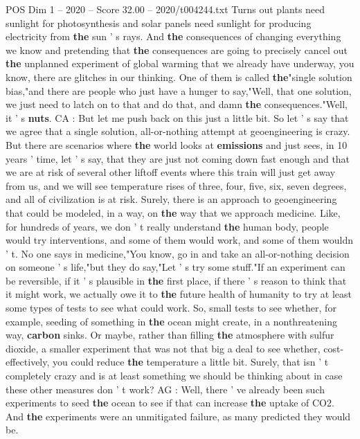 \begin{textsample}{POS Dim 1 – 2020 – Score 32.00 – 2020/t004244.txt}
Turns out plants need sunlight for photosynthesis and solar panels need sunlight for producing electricity from \textbf{the} sun ' s rays.
And \textbf{the} consequences of changing everything we know and pretending that \textbf{the} consequences are going to precisely cancel out \textbf{the} unplanned experiment of global warming that we already have underway, you know, there are glitches in our thinking.
One of them is called \textbf{the}"single solution bias,"and there are people who just have a hunger to say,"Well, that one solution, we just need to latch on to that and do that, and damn \textbf{the} consequences."Well, it ' s \textbf{nuts}.
CA : But let me push back on this just a little bit.
So let ' s say that we agree that a single solution, all-or-nothing attempt at geoengineering is crazy.
But there are scenarios where \textbf{the} world looks at \textbf{emissions} and just sees, in 10 years ' time, let ' s say, that they are just not coming down fast enough and that we are at risk of several other liftoff events where this train will just get away from us, and we will see temperature rises of three, four, five, six, seven degrees, and all of civilization is at risk.
Surely, there is an approach to geoengineering that could be modeled, in a way, on \textbf{the} way that we approach medicine.
Like, for hundreds of years, we don ' t really understand \textbf{the} human body, people would try interventions, and some of them would work, and some of them wouldn ' t.
No one says in medicine,"You know, go in and take an all-or-nothing decision on someone ' s life,"but they do say,"Let ' s try some stuff."If an experiment can be reversible, if it ' s plausible in \textbf{the} first place, if there ' s reason to think that it might work, we actually owe it to \textbf{the} future health of humanity to try at least some types of tests to see what could work.
So, small tests to see whether, for example, seeding of something in \textbf{the} ocean might create, in a nonthreatening way, \textbf{carbon} sinks.
Or maybe, rather than filling \textbf{the} atmosphere with sulfur dioxide, a smaller experiment that was not that big a deal to see whether, cost-effectively, you could reduce \textbf{the} temperature a little bit.
Surely, that isn ' t completely crazy and is at least something we should be thinking about in case these other measures don ' t work?
AG : Well, there ' ve already been such experiments to seed \textbf{the} ocean to see if that can increase \textbf{the} uptake of CO2.
And \textbf{the} experiments were an unmitigated failure, as many predicted they would be.

\end{textsample}
